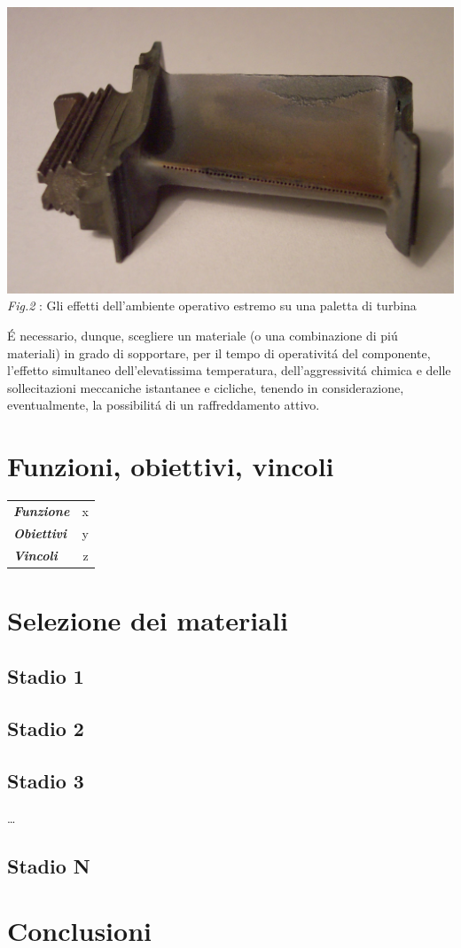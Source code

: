 \documentclass{article}
\begin{document}
    \begin{center}
        \includegraphics[width=\textwidth]{Sources/Turbinenschaufel_RB199.jpg}
        \textit{Fig.2 }: Gli effetti dell'ambiente operativo estremo su una paletta di turbina \autocite*{turbine_blade}
         \label{fig:paletta_logorata}
    \end{center}
    É necessario, dunque, scegliere un materiale (o una combinazione di piú materiali)
    in grado di sopportare, per il tempo di operativitá del componente, l'effetto
    simultaneo dell'elevatissima temperatura, dell'aggressivitá chimica e delle sollecitazioni meccaniche istantanee e cicliche,
     tenendo in considerazione, eventualmente, la possibilitá di un raffreddamento attivo.\\

    \pagebreak




    \section{Funzioni, obiettivi, vincoli\label{funz_vinc_ob}}
        \begin{tabular}{l|r}
            \toprule
                \textbf{\textit{Funzione}}   & x\\
                \textbf{\textit{Obiettivi}}  & y\\ 
                \textbf{\textit{Vincoli}}    & z\\ 
            \bottomrule
        \end{tabular}   
    \section{Selezione dei materiali\label{material_selection}}
        \subsection{Stadio 1}
        \subsection{Stadio 2}
        \subsection{Stadio 3}
        \dots
        \subsection{Stadio N}
        \pagebreak
    \section{Conclusioni\label{conclusioni}}
    \pagebreak
    \printbibliography
    
\end{document}
